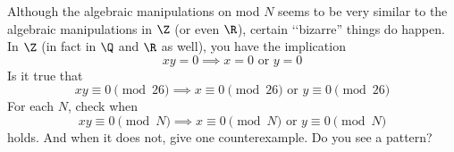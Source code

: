 Although the algebraic manipulations on mod $N$ seems to be very similar to
the algebraic manipulations in $\Z$ (or even $\R$),
certain \lq\lq bizarre'' things do happen.
  In $\Z$ (in fact in $\Q$ and $\R$ as well), you have the implication
  \[
    x y = 0 \implies x = 0 \text{ or } y = 0
  \]
  Is it true that
  \[
    x y \equiv 0 \pmod{26} \implies x \equiv 0 \pmod{26} \text{ or } y \equiv 0 \pmod{26}
  \]
  For each $N$, check when
  \[
    x y \equiv 0 \pmod{N} \implies x \equiv 0 \pmod{N} \text{ or } y \equiv 0 \pmod{N}
  \]
  holds.
  And when it does not, give one counterexample.
  Do you see a pattern?
